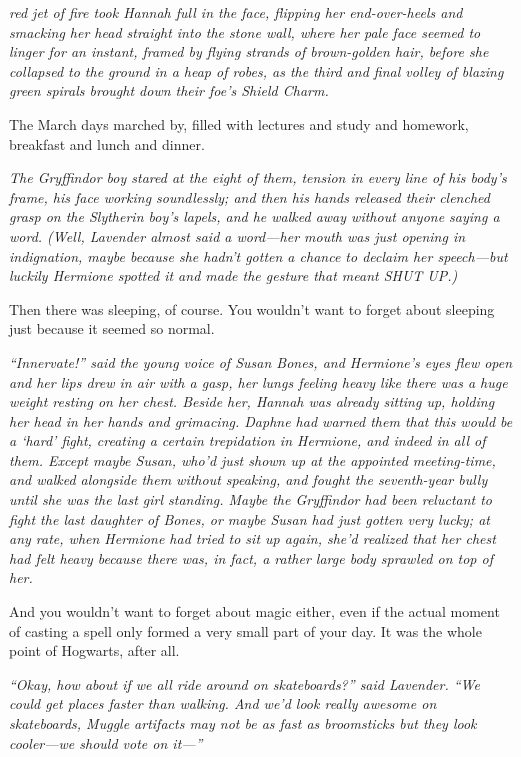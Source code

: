 
 \emph{red jet
of fire took Hannah full in the face, flipping her end-over-heels and smacking
her head straight into the stone wall, where her pale face seemed to linger for
an instant, framed by flying strands of brown-golden hair, before she collapsed
to the ground in a heap of robes, as the third and final volley of blazing
green spirals brought down their foe's Shield Charm.}

The March days marched by, filled with lectures and study and homework,
breakfast and lunch and dinner.

\emph{The Gryffindor boy stared at the eight of them, tension in every line of
his body's frame, his face working soundlessly; and then his hands released
their clenched grasp on the Slytherin boy's lapels, and he walked away without
anyone saying a word. (Well, Lavender almost said a word---her mouth was just
opening in indignation, maybe because she hadn't gotten a chance to declaim her
speech---but luckily Hermione spotted it and made the gesture that meant SHUT
UP.)}

Then there was sleeping, of course. You wouldn't want to forget about sleeping
just because it seemed so normal.

\emph{``Innervate!'' said the young voice of Susan Bones, and Hermione's eyes
flew open and her lips drew in air with a gasp, her lungs feeling heavy like
there was a huge weight resting on her chest. Beside her, Hannah was already
sitting up, holding her head in her hands and grimacing. Daphne had warned them
that this would be a `hard' fight, creating a certain trepidation in Hermione,
and indeed in all of them. Except maybe Susan, who'd just shown up at the
appointed meeting-time, and walked alongside them without speaking, and fought
the seventh-year bully until she was the last girl standing. Maybe the
Gryffindor had been reluctant to fight the last daughter of Bones, or maybe
Susan had just gotten very lucky; at any rate, when Hermione had tried to sit
up again, she'd realized that her chest had felt heavy because there was, in
fact, a rather large body sprawled on top of her.}

And you wouldn't want to forget about magic either, even if the actual moment
of casting a spell only formed a very small part of your day. It was the whole
point of Hogwarts, after all.

\emph{``Okay, how about if we all ride around on skateboards?'' said Lavender.
``We could get places faster than walking. And we'd look really awesome on
skateboards, Muggle artifacts may not be as fast as broomsticks but they look
cooler---we should vote on it---''}

